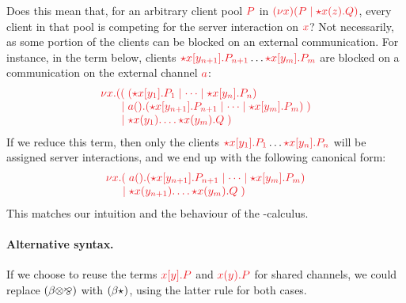 \documentclass[envcountsame,UKenglish]{llncs}
\begin{document}
Does this mean that, for an arbitrary client pool $\tm{P}$ in $\tm{\cpCut{x}{P}{\ncSrv{x}{z}{Q}}}$, every client in that pool is competing for the server interaction on $\tm{x}$? Not necessarily, as some portion of the clients can be blocked on an external communication. For instance, in the term below, clients $\tm{\ncCnt{x}{y_{n+1}}{P_{n+1}}} \dots \tm{\ncCnt{x}{y_m}{P_m}}$ are blocked on a communication on the external channel $\tm{a}$:
\[
  \arraycolsep=0pt
  \tm{
  \begin{array}{lrl}
    \nu x.&  ((&\; \ncPool{\ncCnt{x}{y_1}{P_1}}{\dots\mid\ncCnt{x}{y_n}{P_n}}\\
          &\mid&\; \cpWait{a}{\ncPool{\ncCnt{x}{y_{n+1}}{P_{n+1}}}{\dots \mid \ncCnt{x}{y_m}{P_m}}}\;)\\
          &\mid&\; \ncSrv{x}{y_1}{\dots\ncSrv{x}{y_m}{Q}}\;)
  \end{array}}
\]
If we reduce this term, then only the clients $\tm{\ncCnt{x}{y_1}{P_1}} \dots \tm{\ncCnt{x}{y_n}{P_n}}$ will be assigned server interactions, and we end up with the following canonical form:
\[
  \arraycolsep=0pt
  \tm{
  \begin{array}{lrl}
    \nu x.&   (&\; \cpWait{a}{\ncPool{\ncCnt{x}{y_{n+1}}{P_{n+1}}}{\dots\mid\ncCnt{x}{y_m}{P_m}}}\\
          &\mid&\; \ncSrv{x}{y_{n+1}}{\dots\ncSrv{x}{y_m}{Q}}\;)
  \end{array}}
\]
This matches our intuition and the behaviour of the \textpi-calculus.

\paragraph{Alternative syntax.}
If we choose to reuse the terms $\tm{\piSend{x}{y}{P}}$ and $\tm{\piRecv{x}{y}{P}}$ for shared channels, we could replace $(\beta{\ensuremath{\otimes}}{\mathbin{\bindnasrepma}})$ with $(\beta{\star}_{})$, using the latter rule for both cases.
\end{document}
